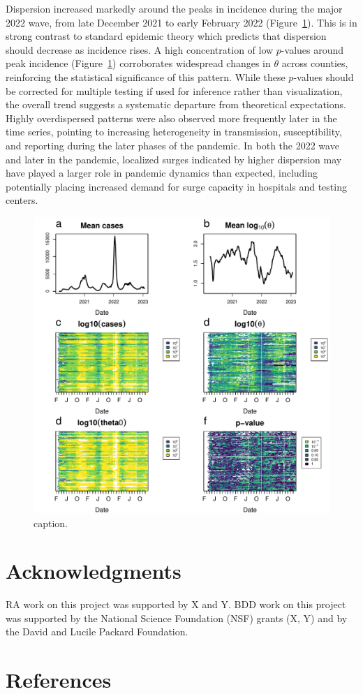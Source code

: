 \documentclass[11pt,letterpaper]{article}
\begin{document}
Dispersion increased markedly around the peaks in incidence during the major 2022 wave, from late December 2021 to early February 2022 (Figure~\ref{fig3}).
This is in strong contrast to standard epidemic theory which predicts that dispersion should decrease as incidence rises.
A high concentration of low $p$-values around peak incidence (Figure~\ref{fig3}) corroborates widespread changes in $\theta$ across counties, reinforcing the statistical significance of this pattern.
While these $p$-values should be corrected for multiple testing if used for inference rather than visualization, the overall trend suggests a systematic departure from theoretical expectations.
Highly overdispersed patterns were also observed more frequently later in the time series, pointing to increasing heterogeneity in transmission, susceptibility, and reporting during the later phases of the pandemic. 
In both the 2022 wave and later in the pandemic, localized surges indicated by higher dispersion may have played a larger role in pandemic dynamics than expected, including potentially placing increased demand for surge capacity in hospitals and testing centers.

\clearpage
\begin{figure}[!ht]
\includegraphics[width=1\textwidth]{fig3}
\caption{caption.}\label{fig3}
\end{figure}
\clearpage


\section*{Acknowledgments}
RA work on this project was supported by X and Y. BDD work on this project was supported by the National Science Foundation (NSF) grants (X, Y) and by the David and Lucile Packard Foundation.

\clearpage
\section*{References}
 
 

\end{document}
